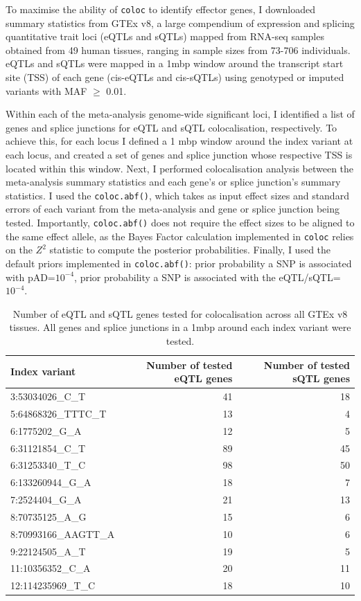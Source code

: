 To maximise the ability of \Verb+coloc+ to identify effector genes, I downloaded summary statistics from GTEx v8, a large compendium of expression and splicing quantitative trait loci (eQTLs and sQTLs) mapped from RNA-seq samples obtained from 49 human tissues, ranging in sample sizes from 73-706 individuals. eQTLs and sQTLs were mapped in a 1mbp window around the transcript start site (TSS) of each gene (cis-eQTLs and cis-sQTLs) using genotyped or imputed variants with MAF $\geq$ 0.01.

Within each of the meta-analysis genome-wide significant loci, I identified a list of genes and splice junctions for eQTL and sQTL colocalisation, respectively. To achieve this, for each locus I defined a 1 mbp window around the index variant at each locus, and created a set of genes and splice junction whose respective TSS is located within this window. Next, I performed colocalisation analysis between the meta-analysis summary statistics and each gene's or splice junction's summary statistics. I used the \Verb+coloc.abf()+, which takes as input effect sizes and standard errors of each variant from the meta-analysis and gene or splice junction being tested. Importantly, \Verb+coloc.abf()+ does not require the effect sizes to be aligned to the same effect allele, as the Bayes Factor calculation implemented in \Verb+coloc+ relies on the $Z^{2}$ statistic to compute the posterior probabilities. Finally, I used the default priors implemented in \Verb+coloc.abf()+: prior probability a SNP is associated with pAD=$10^{-4}$, prior probability a SNP is associated with the eQTL/sQTL=$10^{-4}$.

\begin{table}[H]

  \caption{Number of eQTL and sQTL genes tested for colocalisation across all GTEx v8 tissues. All genes and splice junctions in a 1mbp around each index variant were tested.}
  \centering
  \begin{tabular}[t]{|l|r|r|}
  \hline
  Index variant & Number of tested eQTL genes & Number of tested sQTL genes\\
  \hline
  3:53034026\_C\_T & 41 & 18\\
  \hline
  5:64868326\_TTTC\_T & 13 & 4\\
  \hline
  6:1775202\_G\_A & 12 & 5\\
  \hline
  6:31121854\_C\_T & 89 & 45\\
  \hline
  6:31253340\_T\_C & 98 & 50\\
  \hline
  6:133260944\_G\_A & 18 & 7\\
  \hline
  7:2524404\_G\_A & 21 & 13\\
  \hline
  8:70735125\_A\_G & 15 & 6\\
  \hline
  8:70993166\_AAGTT\_A & 10 & 6\\
  \hline
  9:22124505\_A\_T & 19 & 5\\
  \hline
  11:10356352\_C\_A & 20 & 11\\
  \hline
  12:114235969\_T\_C & 18 & 10\\
  \hline
  \end{tabular}
  \end{table}



